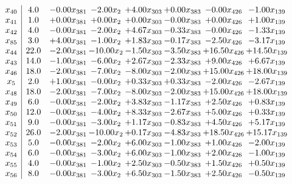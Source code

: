 \documentclass[8pt]{article}
\begin{document}
\[\begin{array}{c| c c@{\hskip 2pt} c@{\hskip 2pt} c@{\hskip 2pt} c@{\hskip 2pt} c@{\hskip 2pt} c@{\hskip 2pt} }
 x_{40}   &  4.0 & -0.00 x_{381} & -2.00 x_{2} & +  4.00 x_{303} & +  0.00 x_{383} & -0.00 x_{426} & -1.00 x_{139}\\
 x_{41}   &  1.0 & +  0.00 x_{381} & +  0.00 x_{2} & +  0.00 x_{303} & -0.00 x_{383} & +  0.00 x_{426} & +  1.00 x_{139}\\
 x_{42}   &  4.0 & -0.00 x_{381} & -2.00 x_{2} & +  4.67 x_{303} & -0.33 x_{383} & -0.00 x_{426} & -1.33 x_{139}\\
 x_{85}   &  3.0 & +  4.00 x_{381} & -1.00 x_{2} & +  1.83 x_{303} & -0.17 x_{383} & -2.50 x_{426} & -3.17 x_{139}\\
 x_{44}   &  22.0 & -2.00 x_{381} & -10.00 x_{2} & -1.50 x_{303} & -3.50 x_{383} & + 16.50 x_{426} & + 14.50 x_{139}\\
 x_{43}   &  14.0 & -1.00 x_{381} & -6.00 x_{2} & +  2.67 x_{303} & -2.33 x_{383} & +  9.00 x_{426} & +  6.67 x_{139}\\
 x_{46}   &  18.0 & -2.00 x_{381} & -7.00 x_{2} & -8.00 x_{303} & -2.00 x_{383} & + 15.00 x_{426} & + 18.00 x_{139}\\
 x_{5}   &  2.0 & +  1.00 x_{381} & -0.00 x_{2} & +  0.33 x_{303} & +  0.33 x_{383} & -2.00 x_{426} & -2.67 x_{139}\\
 x_{48}   &  18.0 & -2.00 x_{381} & -7.00 x_{2} & -8.00 x_{303} & -2.00 x_{383} & + 15.00 x_{426} & + 18.00 x_{139}\\
 x_{49}   &  6.0 & -0.00 x_{381} & -2.00 x_{2} & +  3.83 x_{303} & -1.17 x_{383} & +  2.50 x_{426} & +  0.83 x_{139}\\
 x_{50}   &  12.0 & -0.00 x_{381} & -4.00 x_{2} & +  8.33 x_{303} & -2.67 x_{383} & +  5.00 x_{426} & +  0.33 x_{139}\\
 x_{51}   &  9.0 & -0.00 x_{381} & -3.00 x_{2} & +  1.17 x_{303} & -0.83 x_{383} & +  4.50 x_{426} & +  5.17 x_{139}\\
 x_{52}   &  26.0 & -2.00 x_{381} & -10.00 x_{2} & +  0.17 x_{303} & -4.83 x_{383} & + 18.50 x_{426} & + 15.17 x_{139}\\
 x_{53}   &  5.0 & -0.00 x_{381} & -2.00 x_{2} & +  6.00 x_{303} & -1.00 x_{383} & +  1.00 x_{426} & -2.00 x_{139}\\
 x_{54}   &  6.0 & -0.00 x_{381} & -3.00 x_{2} & +  6.00 x_{303} & -1.00 x_{383} & +  2.00 x_{426} & -1.00 x_{139}\\
 x_{55}   &  4.0 & -0.00 x_{381} & -1.00 x_{2} & +  2.50 x_{303} & -0.50 x_{383} & +  1.50 x_{426} & +  0.50 x_{139}\\
 x_{56}   &  8.0 & -0.00 x_{381} & -3.00 x_{2} & +  6.50 x_{303} & -1.50 x_{383} & +  2.50 x_{426} & -0.50 x_{139}\\

\end{array}\]
\end{document}
